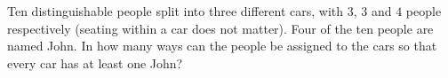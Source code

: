 Ten distinguishable people split into three different cars, with $3$, $3$ and $4$ people respectively (seating within a car does not matter). Four of the ten people are named John. In how many ways can the people be assigned to the cars so that every car has at least one John?
